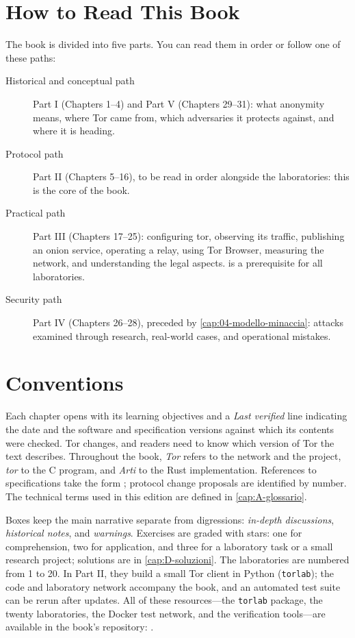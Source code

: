 \section*{How to Read This Book}

The book is divided into five parts. You can read them in order or follow one of these paths:
\begin{description}
  \item[Historical and conceptual path] Part I (Chapters 1--4) and Part V (Chapters 29--31): what anonymity means, where Tor came from, which adversaries it protects against, and where it is heading.
  \item[Protocol path] Part II (Chapters 5--16), to be read in order alongside the laboratories: this is the core of the book.
  \item[Practical path] Part III (Chapters 17--25): configuring tor, observing its traffic, publishing an onion service, operating a relay, using Tor Browser, measuring the network, and understanding the legal aspects.  is a prerequisite for all laboratories.
  \item[Security path] Part IV (Chapters 26--28), preceded by \cref{cap:04-modello-minaccia}: attacks examined through research, real-world cases, and operational mistakes.
\end{description}

\section*{Conventions}

Each chapter opens with its learning objectives and a \emph{Last verified} line indicating the date and the software and specification versions against which its contents were checked. Tor changes, and readers need to know which version of Tor the text describes. Throughout the book, \emph{Tor} refers to the network and the project, \emph{tor} to the C program, and \emph{Arti} to the Rust implementation. References to specifications take the form ; protocol change proposals are identified by number. The technical terms used in this edition are defined in \cref{cap:A-glossario}.

Boxes keep the main narrative separate from digressions: \emph{in-depth discussions}, \emph{historical notes}, and \emph{warnings}. Exercises are graded with stars: one for comprehension, two for application, and three for a laboratory task or a small research project; solutions are in \cref{cap:D-soluzioni}. The laboratories are numbered from 1 to 20. In Part II, they build a small Tor client in Python (\texttt{torlab}); the code and laboratory network accompany the book, and an automated test suite can be rerun after updates. All of these resources---the \texttt{torlab} package, the twenty laboratories, the Docker test network, and the verification tools---are available in the book's repository: \repolibro.

